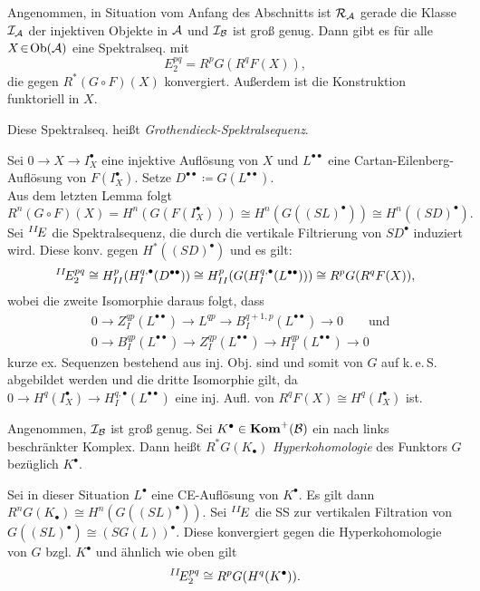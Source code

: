 \documentclass{cheat-sheet}
\newcommand{\CC}[1]{{#1}_{\bullet}} %
\newcommand{\CCC}[1]{{#1}^{\bullet}} %
\newcommand{\DC}[1]{{#1}^{\bullet \bullet}} %
\newcommand{\keS}{k.\,e.\,S.} %
\newcommand{\Inj}{\mathcal{I}} %
\newcommand{\Ada}{\mathcal{R}} %
\begin{document}

\begin{thm}
  Angenommen, in Situation vom Anfang des Abschnitts ist $\Ada_\Aat$ gerade die Klasse $\Inj_\Aat$ der injektiven Objekte in $\mathcal{A}$ und $\mathcal{I}_{\mathcal{B}}$ ist groß genug.
  Dann gibt es für alle $X \!\in\! \operatorname{Ob}(\mathcal{A})$ eine Spektralseq. mit
  \[ E^{pq}_2 = R^p G(R^q F(X)), \]
  die gegen $R^*(G \circ F)(X)$ konvergiert.
  Außerdem ist die Konstruktion funktoriell in $X$.
\end{thm}

\begin{defn}
  Diese Spektralseq. heißt \emph{Grothendieck-Spektralsequenz}.
\end{defn}

\begin{beweis}
  Sei $0 \to X \to \CCC{I}_X$ eine injektive Auflösung von $X$ und $\DC{L}$ eine Cartan-Eilenberg-Auflösung von $F(\CCC{I}_X)$.
  Setze $\DC{D} \coloneqq G(\DC{L})$. \\
  Aus dem letzten Lemma folgt
  \[ R^n (G \circ F)(X) = H^n(G(F(\CCC{I}_X))) \cong H^n(G(\CCC{(SL)})) \cong H^n(\CCC{(SD)}). \]
  Sei $\prescript{II}{}\!E$ die Spektralsequenz, die durch die vertikale Filtrierung von $\CCC{SD}$ induziert wird. Diese konv. gegen $H^*(\CCC{(SD)})$ und es gilt:
  \[ \prescript{II}{}\!E^{pq}_2 \cong H_{II}^{p}(H_I^{q,\bullet}(\DC{D})) \cong H_{II}^p(G(H_I^{q,\bullet}(\DC{L}))) \cong R^p G(R^q F(X)), \]
  wobei die zweite Isomorphie daraus folgt, dass
  \begin{align*}
    & 0 \to Z^{qp}_I(\DC{L}) \to L^{qp} \to B^{q+1,p}_I(\DC{L}) \to 0
    \qquad \text{und} \\
    & 0 \to B^{qp}_I(\DC{L}) \to Z^{qp}_I(\DC{L}) \to H^{qp}_I(\DC{L}) \to 0
  \end{align*}
  kurze ex. Sequenzen bestehend aus inj. Obj. sind und somit von $G$ auf \keS{} abgebildet werden und die dritte Isomorphie gilt, da $0 \to H^q(\CCC{I}_X) \to H^{q,\bullet}_I(\DC{L})$ eine inj. Aufl. von $R^q F(X) \cong H^q(\CCC{I}_X)$ ist.
\end{beweis}

\begin{defn}
  Angenommen, $\Inj_\Bat$ ist groß genug.
  Sei $\CCC{K} \in \Kom^+(\Bat)$ ein nach links beschränkter Komplex.
  Dann heißt $R^* G(\CC{K})$ \emph{Hyperkohomologie} des Funktors $G$ bezüglich $\CCC{K}$.
\end{defn}

\begin{bem}
  Sei in dieser Situation $\CCC{L}$ eine CE-Auflösung von $\CCC{K}$.
  Es gilt dann $R^n G(\CC{K}) \cong H^n (G(\CCC{(SL)}))$.
  Sei $\prescript{II}{}\!E$ die SS zur vertikalen Filtration von $G(\CCC{(SL)}) \cong \CCC{(S G(L))}$. Diese konvergiert gegen die Hyperkohomologie von $G$ bzgl. $\CCC{K}$ und ähnlich wie oben gilt
  \[ \prescript{II}{}\!E^{pq}_2 \cong R^p G(H^q (\CCC{K})). \]
\end{bem}
\end{document}
